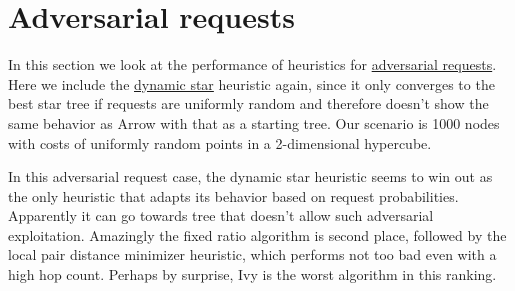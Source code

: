 \documentclass[a4paper, oneside]{discothesis}
\begin{document}
\section{Adversarial requests}\label{result:adversary}

In this section we look at the performance of heuristics for \hyperref[req:adversary]{adversarial requests}. Here we include the \hyperref[alg:dynstar]{dynamic star} heuristic again, since it only converges to the best star tree if requests are uniformly random and therefore doesn't show the same behavior as Arrow with that as a starting tree. Our scenario is 1000 nodes with costs of uniformly random points in a 2-dimensional hypercube.


In this adversarial request case, the dynamic star heuristic seems to win out as the only heuristic that adapts its behavior based on request probabilities. Apparently it can go towards tree that doesn't allow such adversarial exploitation. Amazingly the fixed ratio algorithm is second place, followed by the local pair distance minimizer heuristic, which performs not too bad even with a high hop count. Perhaps by surprise, Ivy is the worst algorithm in this ranking.
\end{document}
